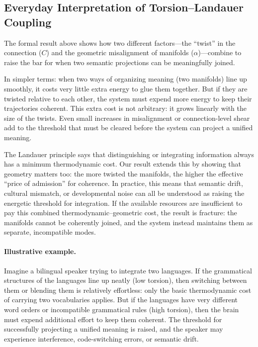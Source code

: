 \documentclass[a4paper,11pt]{article}
\begin{document}
\subsection{Everyday Interpretation of Torsion--Landauer Coupling}

The formal result above shows how two different factors---the ``twist'' in the
connection ($C$) and the geometric misalignment of manifolds ($\alpha$)---combine
to raise the bar for when two semantic projections can be meaningfully joined.

In simpler terms: when two ways of organizing meaning (two manifolds) line up
smoothly, it costs very little extra energy to glue them together. But if they
are twisted relative to each other, the system must expend more energy to keep
their trajectories coherent. This extra cost is not arbitrary: it grows
linearly with the size of the twists. Even small increases in misalignment or
connection-level shear add to the threshold that must be cleared before the
system can project a unified meaning.

The Landauer principle says that distinguishing or integrating information
always has a minimum thermodynamic cost. Our result extends this by showing
that geometry matters too: the more twisted the manifolds, the higher the
effective ``price of admission'' for coherence. In practice, this means that
semantic drift, cultural mismatch, or developmental noise can all be understood
as raising the energetic threshold for integration. If the available resources
are insufficient to pay this combined thermodynamic--geometric cost, the result
is fracture: the manifolds cannot be coherently joined, and the system instead
maintains them as separate, incompatible modes.

\paragraph{Illustrative example.}
Imagine a bilingual speaker trying to integrate two languages. If the
grammatical structures of the languages line up neatly (low torsion), then
switching between them or blending them is relatively effortless: only the
basic thermodynamic cost of carrying two vocabularies applies. But if the
languages have very different word orders or incompatible grammatical rules
(high torsion), then the brain must expend additional effort to keep them
coherent. The threshold for successfully projecting a unified meaning is
raised, and the speaker may experience interference, code-switching errors, or
semantic drift.
\end{document}
